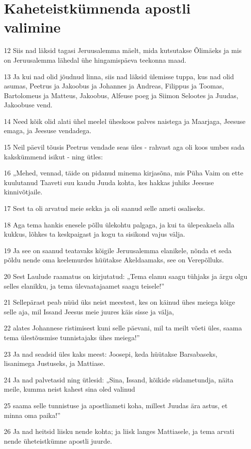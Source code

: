 \section*{Kaheteistkümnenda apostli valimine}

\par 12 Siis nad läksid tagasi Jeruusalemma mäelt, mida kutsutakse Õlimäeks ja mis on Jeruusalemma lähedal ühe hingamispäeva teekonna maad.
\par 13 Ja kui nad olid jõudnud linna, siis nad läksid ülemisse tuppa, kus nad olid asumas, Peetrus ja Jakoobus ja Johannes ja Andreas, Filippus ja Toomas, Bartolomeus ja Matteus, Jakoobus, Alfeuse poeg ja Siimon Selootes ja Juudas, Jakoobuse vend.
\par 14 Need kõik olid alati ühel meelel üheskoos palves naistega ja Maarjaga, Jeesuse emaga, ja Jeesuse vendadega.
\par 15 Neil päevil tõusis Peetrus vendade seas üles - rahvast aga oli koos umbes sada kakskümmend isikut - ning ütles:
\par 16 „Mehed, vennad, täide on pidanud minema kirjasõna, mis Püha Vaim on ette kuulutanud Taaveti suu kaudu Juuda kohta, kes hakkas juhiks Jeesuse kinnivõtjaile.
\par 17 Sest ta oli arvatud meie sekka ja oli saanud selle ameti osaliseks.
\par 18 Aga tema hankis enesele põllu ülekohtu palgaga, ja kui ta ülepeakaela alla kukkus, lõhkes ta keskpaigast ja kogu ta sisikond vajus välja.
\par 19 Ja see on saanud teatavaks kõigile Jeruusalemma elanikele, nõnda et seda põldu nende oma keelemurdes hüütakse Akeldaamaks, see on Verepõlluks.
\par 20 Sest Laulude raamatus on kirjutatud: „Tema elamu saagu tühjaks ja ärgu olgu selles elanikku, ja tema ülevaatajaamet saagu teisele!”
\par 21 Sellepärast peab nüüd üks neist meestest, kes on käinud ühes meiega kõige selle aja, mil Issand Jeesus meie juures käis sisse ja välja,
\par 22 alates Johannese ristimisest kuni selle päevani, mil ta meilt võeti üles, saama tema ülestõusmise tunnistajaks ühes meiega!”
\par 23 Ja nad seadsid üles kaks meest: Joosepi, keda hüütakse Barsabaseks, lisanimega Justuseks, ja Mattiase.
\par 24 Ja nad palvetasid ning ütlesid: „Sina, Issand, kõikide südametundja, näita meile, kumma neist kahest sina oled valinud
\par 25 saama selle tunnistuse ja apostliameti koha, millest Juudas ära astus, et minna oma paika!”
\par 26 Ja nad heitsid liisku nende kohta; ja liisk langes Mattiasele, ja tema arvati nende üheteistkümne apostli juurde.


